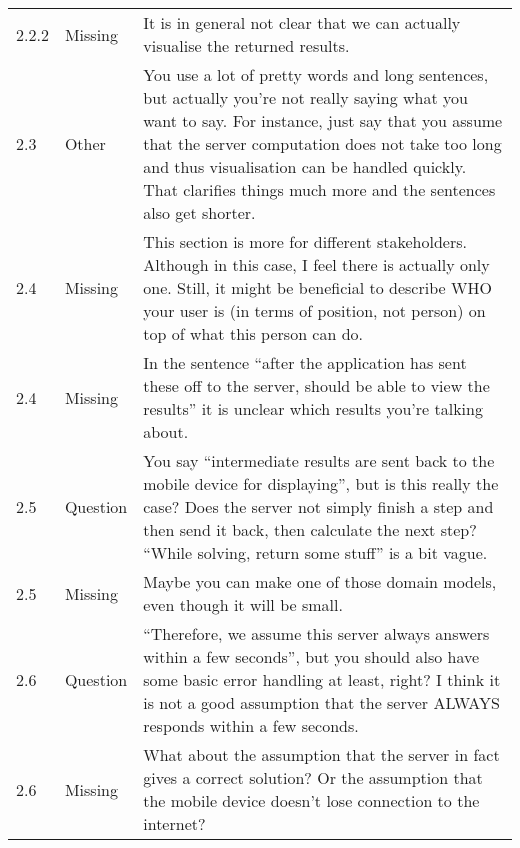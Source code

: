 \begin{longtable}{l|l|p{}}
2.2.2 & Missing & It is in general not clear that we can actually visualise the returned results.\\
2.3 & Other & You use a lot of pretty words and long sentences, but actually you're not really saying what you want to say. For instance, just say that you assume that the server computation does not take too long and thus visualisation can be handled quickly.  That clarifies things much more and the sentences also get shorter. \\
2.4 & Missing & This section is more for different stakeholders. Although in this case, I feel there is actually only one. Still, it might be beneficial to describe WHO your user is (in terms of position, not person) on top of what this person can do. \\
2.4 & Missing & In the sentence ``after the application has sent these off to the server, should be able to view the results'' it is unclear which results you're talking about. \\
2.5 & Question & You say ``intermediate results are sent back to the mobile device for displaying'', but is this really the case? Does the server not simply finish a step and then send it back, then calculate the next step? ``While solving, return some stuff'' is a bit vague. \\
2.5 & Missing & Maybe you can make one of those domain models, even though it will be small. \\
2.6 & Question & ``Therefore, we assume this server always answers within a few seconds'', but you should also have some basic error handling at least, right? I think it is not a good assumption that the server ALWAYS responds within a few seconds.  \\
2.6 & Missing & What about the assumption that the server in fact gives a correct solution? Or the assumption that the mobile device doesn't lose connection to the internet? \\
\end{longtable}

